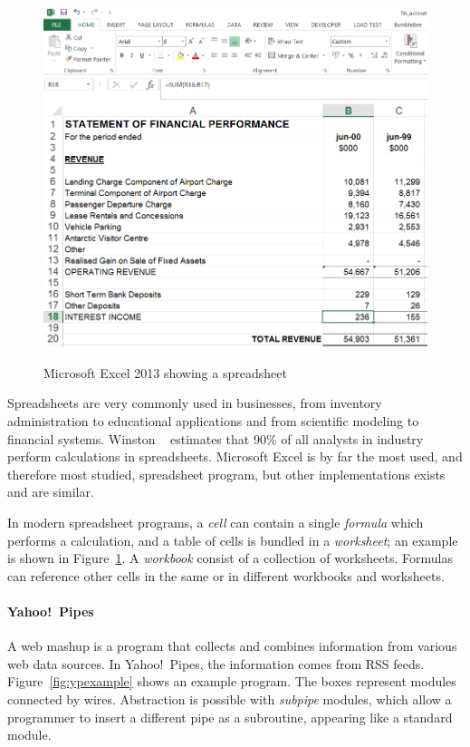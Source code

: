 \documentclass[10pt,conference,compsocconf]{IEEEtran}
\begin{document}
\begin{figure}
\caption{Microsoft Excel 2013 showing a spreadsheet}
\centering
\includegraphics[width=\columnwidth]{excel-2}
\label{fig:spreadsheetexample}
\end{figure}

Spreadsheets are very commonly used in businesses, from inventory administration to educational applications and from scientific modeling to financial systems.
Winston ~\cite{Wins2001} estimates that 90\% of all analysts in industry perform calculations in spreadsheets. 
Microsoft Excel is by far the most used, and therefore most studied, spreadsheet program, but other implementations exists and are similar.

In modern spreadsheet programs, a \textit{cell} can contain a single \textit{formula} which performs a calculation, and a table of cells is bundled in a \textit{worksheet}; an example is shown in Figure~\ref{fig:spreadsheetexample}. 
A \textit{workbook} consist of a collection of worksheets.
Formulas can reference other cells in the same or in different workbooks and worksheets.


\paragraph{Yahoo!\ Pipes}
A web mashup is a program that collects and combines information from various
web data sources. 
In  Yahoo!\ Pipes, the information comes from RSS feeds. Figure~\ref{fig:ypexample} shows an example program. The boxes represent modules connected by wires. 
Abstraction is possible with \emph{subpipe} modules, which allow a programmer to insert a different pipe as a subroutine, appearing like a standard module. 
\end{document}
